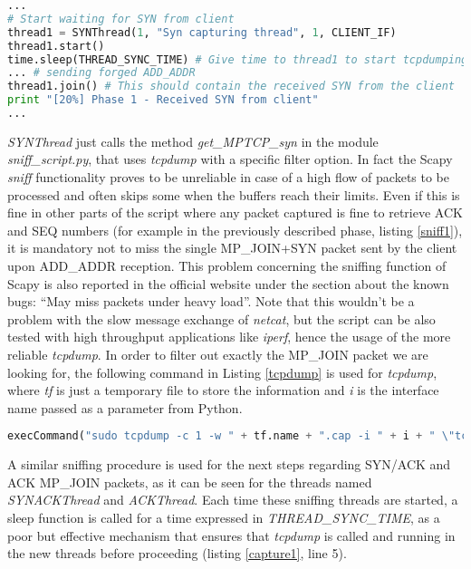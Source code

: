 \begin{lstlisting}[language=python, caption=Multiple threads are used to capture the answer from the UMLs, label=capture1]
...
# Start waiting for SYN from client
thread1 = SYNThread(1, "Syn capturing thread", 1, CLIENT_IF)
thread1.start()
time.sleep(THREAD_SYNC_TIME) # Give time to thread1 to start tcpdumping
... # sending forged ADD_ADDR
thread1.join() # This should contain the received SYN from the client
print "[20%] Phase 1 - Received SYN from client"
...
\end{lstlisting}

\textit{SYNThread} just calls the method \textit{get\_MPTCP\_syn} in the module \textit{sniff\_script.py}, that uses \textit{tcpdump} with a specific filter option. In fact the Scapy \textit{sniff} functionality proves to be unreliable in case of a high flow of packets to be processed and often skips some when the buffers reach their limits. Even if this is fine in other parts of the script where any packet captured is fine to retrieve ACK and SEQ numbers (for example in the previously described phase, listing \ref{sniff1}), it is mandatory not to miss the single MP\_JOIN+SYN packet sent by the client upon ADD\_ADDR reception. This problem concerning the sniffing function of Scapy is also reported in the official website under the section about the known bugs: ``May miss packets under heavy load''.
Note that this wouldn't be a problem with the slow message exchange of \textit{netcat}, but the script can be also tested with high throughput applications like \textit{iperf}, hence the usage of the more reliable \textit{tcpdump}.
In order to filter out exactly the MP\_JOIN packet we are looking for, the following command in Listing \ref{tcpdump} is used for \textit{tcpdump}, where \textit{tf} is just a temporary file to store the information and \textit{i} is the interface name passed as a parameter from Python.

\begin{lstlisting}[language=python, caption=\textit{tcpdump} for MP\_JOIN, label=tcpdump]
execCommand("sudo tcpdump -c 1 -w " + tf.name + ".cap -i " + i + " \"tcp[tcpflags] & tcp-syn != 0\" 2>/dev/null", shell = True)
\end{lstlisting}

A similar sniffing procedure is used for the next steps regarding SYN/ACK and ACK MP\_JOIN packets, as it can be seen for the threads named \textit{SYNACKThread} and \textit{ACKThread}. Each time these sniffing threads are started, a sleep function is called for a time expressed in \textit{THREAD\_SYNC\_TIME}, as a poor but effective mechanism that ensures that \textit{tcpdump} is called and running in the new threads before proceeding (listing \ref{capture1}, line 5).

